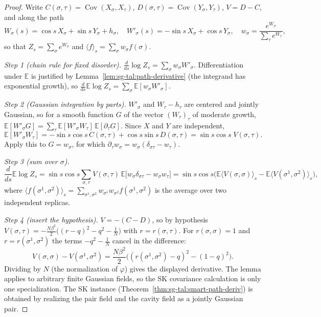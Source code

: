 \begin{proof}
  \leanok
Write $C(\sigma,\tau)=\operatorname{Cov}(X_\sigma,X_\tau)$, $D(\sigma,\tau)=\operatorname{Cov}(Y_\sigma,Y_\tau)$, $V=D-C$, and along the path
\[
W_\sigma(s)=\cos s\,X_\sigma+\sin s\,Y_\sigma+h_\sigma,\quad
W'_\sigma(s)=-\sin s\,X_\sigma+\cos s\,Y_\sigma,\quad
w_\sigma=\frac{e^{W_\sigma}}{\sum_\tau e^{W_\tau}},
\]
so that $Z_s=\sum_\sigma e^{W_\sigma}$ and $\langle f\rangle_s=\sum_\sigma w_\sigma f(\sigma)$.

\emph{Step 1 (chain rule for fixed disorder).} $\frac{d}{ds}\log Z_s=\sum_\sigma w_\sigma W'_\sigma$.
Differentiation under $\mathbb{E}$ is justified by Lemma~\ref{lem:sg-tal:path-derivative} (the integrand has exponential growth), so $\frac{d}{ds}\mathbb{E}\log Z_s=\sum_\sigma\mathbb{E}[w_\sigma W'_\sigma]$.

\emph{Step 2 (Gaussian integration by parts).} $W'_\sigma$ and $W_\tau-h_\tau$ are centered and jointly Gaussian, so for a smooth function $G$ of the vector $(W_\tau)_\tau$ of moderate growth, $\mathbb{E}[W'_\sigma G]=\sum_\tau\mathbb{E}[W'_\sigma W_\tau]\,\mathbb{E}[\partial_\tau G]$. Since $X$ and $Y$ are independent,
\[
\mathbb{E}[W'_\sigma W_\tau]=-\sin s\cos s\,C(\sigma,\tau)+\cos s\sin s\,D(\sigma,\tau)=\sin s\cos s\;V(\sigma,\tau).
\]
Apply this to $G=w_\sigma$, for which $\partial_\tau w_\sigma=w_\sigma(\delta_{\sigma\tau}-w_\tau)$.

\emph{Step 3 (sum over $\sigma$).}
\[
\frac{d}{ds}\mathbb{E}\log Z_s=\sin s\cos s\sum_{\sigma,\tau}V(\sigma,\tau)\,\mathbb{E}\big[w_\sigma\delta_{\sigma\tau}-w_\sigma w_\tau\big]
=\sin s\cos s\Big(\mathbb{E}\langle V(\sigma,\sigma)\rangle_s-\mathbb{E}\langle V(\sigma^1,\sigma^2)\rangle_s\Big),
\]
where $\langle f(\sigma^1,\sigma^2)\rangle_s=\sum_{\sigma^1,\sigma^2}w_{\sigma^1}w_{\sigma^2}f(\sigma^1,\sigma^2)$ is the average over two independent replicas.

\emph{Step 4 (insert the hypothesis).} $V=-(C-D)$, so by hypothesis $V(\sigma,\tau)=-\frac{N\beta^2}{2}\big((r-q)^2-q^2-\frac1N\big)$ with $r=r(\sigma,\tau)$. For $r(\sigma,\sigma)=1$ and $r=r(\sigma^1,\sigma^2)$ the terms $-q^2-\frac1N$ cancel in the difference:
\[
V(\sigma,\sigma)-V(\sigma^1,\sigma^2)=\frac{N\beta^2}{2}\Big((r(\sigma^1,\sigma^2)-q)^2-(1-q)^2\Big).
\]
Dividing by $N$ (the normalization of $\varphi$) gives the displayed derivative. The lemma applies to arbitrary finite Gaussian fields, so the SK covariance calculation is only one specialization.
The SK instance (Theorem~\ref{thm:sg-tal:smart-path-deriv}) is obtained by realizing the pair field and the cavity field as a jointly Gaussian pair.
\end{proof}

